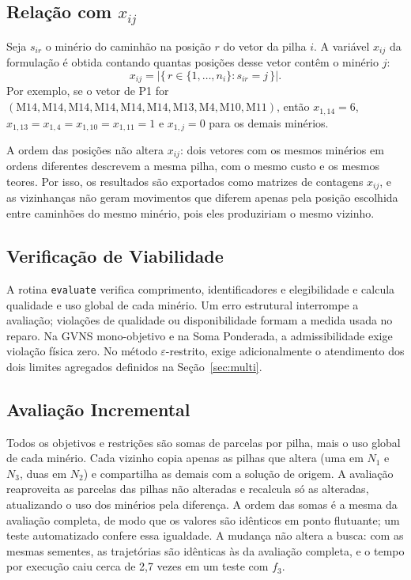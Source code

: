 \documentclass[conference]{IEEEtran}
\begin{document}
\subsection{Relação com $x_{ij}$}
Seja $s_{ir}$ o minério do caminhão na posição $r$ do vetor da pilha $i$.
A variável $x_{ij}$ da formulação é obtida contando quantas posições desse
vetor contêm o minério $j$:
\begin{equation}
x_{ij}=\bigl|\{\,r\in\{1,\ldots,n_i\} : s_{ir}=j\,\}\bigr|.
\end{equation}
Por exemplo, se o vetor de P1 for
$(\mathrm{M14},\mathrm{M14},\mathrm{M14},\mathrm{M14},\mathrm{M14},\mathrm{M14},\mathrm{M13},\mathrm{M4},\mathrm{M10},\mathrm{M11})$,
então $x_{1,14}=6$, $x_{1,13}=x_{1,4}=x_{1,10}=x_{1,11}=1$ e $x_{1,j}=0$
para os demais minérios.

A ordem das posições não altera $x_{ij}$: dois vetores com os mesmos minérios
em ordens diferentes descrevem a mesma pilha, com o mesmo custo e os mesmos
teores. Por isso, os resultados são exportados como matrizes de contagens
$x_{ij}$, e as vizinhanças não geram movimentos que diferem apenas pela
posição escolhida entre caminhões do mesmo minério, pois eles produziriam
o mesmo vizinho.

\subsection{Verificação de Viabilidade}
A rotina \texttt{evaluate} verifica comprimento, identificadores e
elegibilidade e calcula qualidade e uso global de cada minério. Um erro
estrutural interrompe a avaliação; violações de qualidade ou disponibilidade
formam a medida usada no reparo. Na GVNS mono-objetivo e na Soma Ponderada,
a admissibilidade exige violação física zero. No método $\varepsilon$-restrito,
exige adicionalmente o atendimento dos dois limites agregados definidos
na Seção~\ref{sec:multi}.

\subsection{Avaliação Incremental}
Todos os objetivos e restrições são somas de parcelas por pilha, mais o uso
global de cada minério. Cada vizinho copia apenas as pilhas que altera
(uma em $N_1$ e $N_3$, duas em $N_2$) e compartilha as demais com a solução
de origem. A avaliação reaproveita as parcelas das pilhas não alteradas e
recalcula só as alteradas, atualizando o uso dos minérios pela diferença.
A ordem das somas é a mesma da avaliação completa, de modo que os valores
são idênticos em ponto flutuante; um teste automatizado confere essa
igualdade. A mudança não altera a busca: com as mesmas sementes, as
trajetórias são idênticas às da avaliação completa, e o tempo por execução
caiu cerca de 2,7 vezes em um teste com $f_3$.
\end{document}
